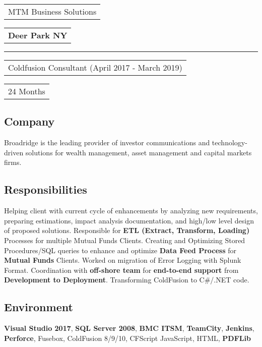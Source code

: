 \documentclass[letterpaper,11pt]{article}
\begin{document}

    \newpage
    \noindent
    \begin{tabular}[t]{@{}l}
    \Large{MTM Business Solutions}
    \end{tabular}
    \hfill
    \begin{tabular}[t]{l@{}}
    \textbf{Deer Park NY}
    \end{tabular}
    \noindent\rule{\textwidth}{0.5pt}
    \begin{tabular}[t]{@{}l}
    Coldfusion Consultant (April 2017 - March 2019)
    \end{tabular}
    \hfill
    \begin{tabular}[t]{l@{}}
    24 Months
    \end{tabular}

    \subsection{Company}
    Broadridge is the leading provider of investor communications and technology-driven solutions for wealth management, asset management and capital markets firms.

    \subsection{Responsibilities}
    Helping client with current cycle of enhancements by analyzing new requirements, preparing estimations, impact analysis documentation, and high/low level design of proposed solutions. Responsible for \textbf{ETL (Extract, Transform, Loading)} Processes for multiple Mutual Funds Clients. Creating and Optimizing Stored Procedures/SQL queries to enhance and optimize \textbf{Data Feed Process} for \textbf{Mutual Funds} Clients. Worked on migration of Error Logging with Splunk Format. Coordination with \textbf{off-shore team} for \textbf{end-to-end support} from \textbf{Development to Deployment}. Transforming ColdFusion to C\#/.NET code.

    \subsection{Environment}
    \textbf{Visual Studio 2017}, \textbf{SQL Server 2008}, \textbf{BMC ITSM}, \textbf{TeamCity}, \textbf{Jenkins}, \textbf{Perforce}, Fusebox,  ColdFusion 8/9/10, CFScript JavaScript, HTML, \textbf{PDFLib}

\end{document}
